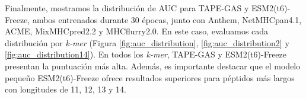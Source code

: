 Finalmente, mostramos la distribución de AUC para TAPE-GAS y ESM2(t6)-Freeze, ambos entrenados durante 30 épocas, junto con Anthem, NetMHCpan4.1, ACME, MixMHCpred2.2 y MHCflurry2.0. En este caso, evaluamos cada distribución por \textit{k-mer} (Figura \ref{fig:auc_distribution}, \ref{fig:auc_distribution2} y \ref{fig:auc_distribution14}). En todos los \textit{k-mer}, TAPE-GAS y ESM2(t6)-Freeze presentan la puntuación más alta. Además, es importante destacar que el modelo pequeño ESM2(t6)-Freeze ofrece resultados superiores para péptidos más largos con longitudes de 11, 12, 13 y 14.



\begin{figure}[H]
	\centering	

\end{figure}
